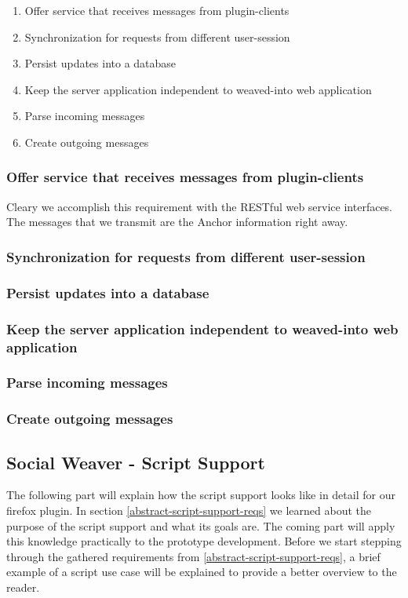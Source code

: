 \begin{enumerate}
	\item Offer service that receives messages from plugin-clients
	\item Synchronization for requests from different user-session
	\item Persist updates into a database
	\item Keep the server application independent to weaved-into web application
	\item Parse incoming messages
	\item Create outgoing messages
\end{enumerate}

\subsubsection{Offer service that receives messages from plugin-clients}
Cleary we accomplish this requirement with the RESTful web service interfaces. The messages that we transmit are the Anchor information right away. 


\subsubsection{Synchronization for requests from different user-session}

\subsubsection{Persist updates into a database}

\subsubsection{Keep the server application independent to weaved-into web application}

\subsubsection{Parse incoming messages}

\subsubsection{Create outgoing messages}

\newpage
\subsection{Social Weaver - Script Support}\label{sowe-script-support}
The following part will explain how the script support looks like in detail for our firefox plugin. In section \ref{abstract-script-support-reqs} we learned about the purpose of the script support and what its goals are. The coming part will apply this knowledge practically to the prototype development. Before we start stepping through the gathered requirements from \ref{abstract-script-support-reqs}, a brief example of a script use case will be explained to provide a better overview to the reader.

